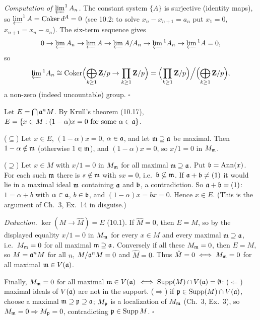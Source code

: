 \documentclass[11pt]{article}
\begin{document}
\emph{Computation of $\varprojlim^1A_n$.} The constant system $\{A\}$ is surjective (identity maps), so $\varprojlim^1A=\operatorname{Coker}d^A=0$ (see 10.2: to solve $x_n-x_{n+1}=a_n$ put $x_1=0$, $x_{n+1}=x_n-a_n$). The six-term sequence gives
\[
0\to\varprojlim A_n\to\varprojlim A\to\varprojlim A/A_n\to\varprojlim{}^1A_n\to\varprojlim{}^1A=0,
\]
so
\[
\varprojlim{}^1A_n\cong\operatorname{Coker}\Bigl(\bigoplus_{k\ge1}\mathbf Z/p\to\prod_{k\ge1}\mathbf Z/p\Bigr)=\Bigl(\prod_{k\ge1}\mathbf Z/p\Bigr)\Big/\Bigl(\bigoplus_{k\ge1}\mathbf Z/p\Bigr),
\]
a non-zero (indeed uncountable) group. \hfill$\square$

\pf
Let $E=\bigcap\mathfrak a^nM$. By Krull's theorem (10.17), $E=\{x\in M:(1-\alpha)x=0\text{ for some }\alpha\in\mathfrak a\}$.

($\subseteq$) Let $x\in E$, $(1-\alpha)x=0$, $\alpha\in\mathfrak a$, and let $\mathfrak m\supseteq\mathfrak a$ be maximal. Then $1-\alpha\notin\mathfrak m$ (otherwise $1\in\mathfrak m$), and $(1-\alpha)x=0$, so $x/1=0$ in $M_\mathfrak m$.

($\supseteq$) Let $x\in M$ with $x/1=0$ in $M_\mathfrak m$ for all maximal $\mathfrak m\supseteq\mathfrak a$. Put $\mathfrak b=\operatorname{Ann}(x)$. For each such $\mathfrak m$ there is $s\notin\mathfrak m$ with $sx=0$, i.e.\ $\mathfrak b\not\subseteq\mathfrak m$. If $\mathfrak a+\mathfrak b\ne(1)$ it would lie in a maximal ideal $\mathfrak m$ containing $\mathfrak a$ and $\mathfrak b$, a contradiction. So $\mathfrak a+\mathfrak b=(1)$: $1=\alpha+b$ with $\alpha\in\mathfrak a$, $b\in\mathfrak b$, and $(1-\alpha)x=bx=0$. Hence $x\in E$. (This is the argument of Ch.~3, Ex.~14 in disguise.)

\emph{Deduction.} $\ker(M\to\hat M)=E$ (10.1). If $\hat M=0$, then $E=M$, so by the displayed equality $x/1=0$ in $M_\mathfrak m$ for every $x\in M$ and every maximal $\mathfrak m\supseteq\mathfrak a$, i.e.\ $M_\mathfrak m=0$ for all maximal $\mathfrak m\supseteq\mathfrak a$. Conversely if all these $M_\mathfrak m=0$, then $E=M$, so $M=\mathfrak a^nM$ for all $n$, $M/\mathfrak a^nM=0$ and $\hat M=0$. Thus $\hat M=0\iff M_\mathfrak m=0$ for all maximal $\mathfrak m\in V(\mathfrak a)$.

Finally, $M_\mathfrak m=0$ for all maximal $\mathfrak m\in V(\mathfrak a)$ $\iff\operatorname{Supp}(M)\cap V(\mathfrak a)=\emptyset$: ($\Leftarrow$) maximal ideals of $V(\mathfrak a)$ are not in the support. ($\Rightarrow$) if $\mathfrak p\in\operatorname{Supp}(M)\cap V(\mathfrak a)$, choose a maximal $\mathfrak m\supseteq\mathfrak p\supseteq\mathfrak a$; $M_\mathfrak p$ is a localization of $M_\mathfrak m$ (Ch.~3, Ex.~3), so $M_\mathfrak m=0\Rightarrow M_\mathfrak p=0$, contradicting $\mathfrak p\in\operatorname{Supp} M$. \hfill$\square$
\end{document}

